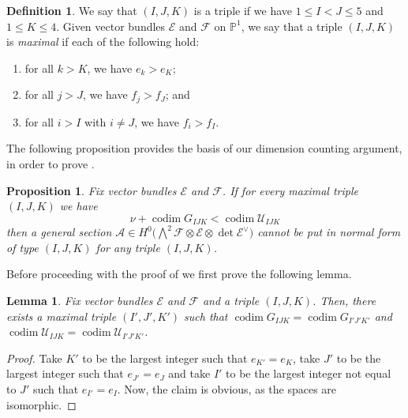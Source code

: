 \documentclass[11pt]{amsart}
\numberwithin{theorem}{section}
\numberwithin{equation}{section}
\newtheorem{proposition}[theorem]{Proposition}
\newtheorem{lemma}[theorem]{Lemma}
\theoremstyle{definition}\newtheorem{defn}[theorem]{Definition}
\theoremstyle{definition}\newtheorem{remark}[theorem]{Remark}
\theoremstyle{definition}\newtheorem{question}[theorem]{Question}
\theoremstyle{definition}\newtheorem{problem}[theorem]{Problem}
\newcommand{\PP}{\mathbb{P}}
\newcommand{\cE}{\mathcal{E}}
\newcommand{\cF}{\mathcal{F}}
\newcommand{\cA}{\mathcal{A}}
\DeclareMathOperator{\codim}{codim}
\newcommand{\marksing}{\mathcal{U}}
\newcommand{\I}{I}
\newcommand{\J}{J}
\newcommand{\K}{K}
\begin{document}
\begin{defn}
We say that $(\I,\J,\K)$ is a triple if we have $1 \leq \I < \J \leq 5$ and $1 \leq \K \leq 4$. Given vector bundles $\cE$ and $\cF$ on $\PP^1$, we say that a triple $(\I,\J,\K)$ is \emph{maximal} if each of the following hold:
\begin{enumerate}[label=(\roman*)]
    \item for all $k > \K$, we have $e_{k} > e_{\K}$;
    \item for all $j > \J$, we have $f_{j} > f_{\J}$; and 
    \item for all $i > \I$ with $i \neq \J$, we have $f_{i} > f_{\I}$.
\end{enumerate}
\end{defn}

The following proposition provides the basis of our dimension counting argument, in order to prove .

\begin{proposition}
\label{lem:main-counting-lemma}
Fix vector bundles $\cE$ and $\cF$. If for every maximal triple $(\I, \J, \K)$ we have 
\[
\nu + \codim G_{\I\J\K} < \codim \marksing_{\I\J\K}
\]
then a general section $\cA \in H^0\Big(\bigwedge\nolimits^2 \cF \otimes \cE \otimes \det \cE^\vee \Big)$ cannot be put in normal form of type $(\I,\J,\K)$ for any triple $(\I,\J,\K)$. 
\end{proposition}

Before proceeding with the proof of  we first prove the following lemma.
\begin{lemma}
\label{lem:maximality}
Fix vector bundles $\cE$ and $\cF$ and a triple $(\I,\J,\K)$. Then, there exists a maximal triple $(\I',\J',\K')$ such that $\codim G_{\I\J\K} = \codim G_{\I'\J'\K'}$ and $\codim \marksing_{\I\J\K} = \codim \marksing_{\I'\J'\K'}$.    
\end{lemma}
\begin{proof}
Take $\K'$ to be the largest integer such that $e_{K'} = e_\K$, take $\J'$ to be the largest integer such that $e_{\J'} = e_\J$ and take $\I'$ to be the largest integer not equal to $\J'$ such that $e_{\I'} = e_\I$. Now, the claim is obvious, as the spaces are isomorphic.
\end{proof}
\end{document}
